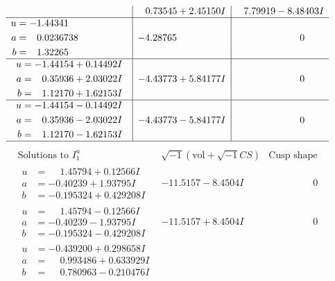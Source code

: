 \documentclass[1p]{elsarticle_modified}
\theoremstyle{definition}
\newcommand{\I}{\sqrt{-1}}
\begin{document}
$$\begin{array}{c|c|c}
 & \phantom{-}0.73545 + 2.45150 I & \phantom{-}7.79919 - 8.48403 I \\ \hline\begin{aligned}
u &= -1.44341\phantom{ +0.000000I} \\
a &= \phantom{-}0.0236738\phantom{ +0.000000I} \\
b &= \phantom{-}1.32265\phantom{ +0.000000I}\end{aligned}
 & -4.28765\phantom{ +0.000000I} & \phantom{-0.000000 } 0 \\ \hline\begin{aligned}
u &= -1.44154 + 0.14492 I \\
a &= \phantom{-}0.35936 + 2.03022 I \\
b &= \phantom{-}1.12170 + 1.62153 I\end{aligned}
 & -4.43773 + 5.84177 I & \phantom{-0.000000 } 0 \\ \hline\begin{aligned}
u &= -1.44154 - 0.14492 I \\
a &= \phantom{-}0.35936 - 2.03022 I \\
b &= \phantom{-}1.12170 - 1.62153 I\end{aligned}
 & -4.43773 - 5.84177 I & \phantom{-0.000000 } 0\\
 \hline 
 \end{array}$$\newpage$$\begin{array}{c|c|c}  
\text{Solutions to }I^u_{1}& \I (\text{vol} + \sqrt{-1}CS) & \text{Cusp shape}\\
 \hline 
\begin{aligned}
u &= \phantom{-}1.45794 + 0.12566 I \\
a &= -0.40239 + 1.93795 I \\
b &= -0.195324 + 0.429208 I\end{aligned}
 & -11.5157 - 8.4504 I & \phantom{-0.000000 } 0 \\ \hline\begin{aligned}
u &= \phantom{-}1.45794 - 0.12566 I \\
a &= -0.40239 - 1.93795 I \\
b &= -0.195324 - 0.429208 I\end{aligned}
 & -11.5157 + 8.4504 I & \phantom{-0.000000 } 0 \\ \hline\begin{aligned}
u &= -0.439200 + 0.298658 I \\
a &= \phantom{-}0.993486 + 0.633929 I \\
b &= \phantom{-}0.780963 - 0.210476 I\end{aligned}

\end{array}$$
\end{document}
